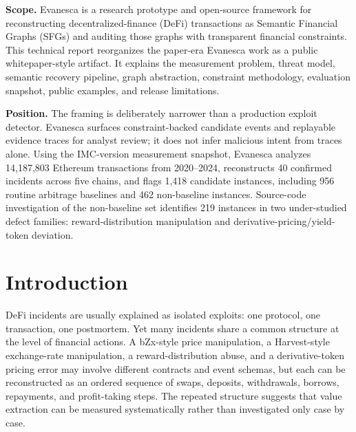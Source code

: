\documentclass[10pt]{article}
\newcommand{\sys}{Evanesca\xspace}
\newcommand{\numtransactions}{14,187,803\xspace}
\newcommand{\numincidents}{40\xspace}
\newcommand{\numflagged}{1,418\xspace}
\newcommand{\numbaseline}{956\xspace}
\newcommand{\numnonbaseline}{462\xspace}
\newcommand{\numdefects}{219\xspace}
\begin{document}
\thispagestyle{firstpage}
\vspace*{0.38in}


\vspace{0.85em}

\vspace{1.65em}

\noindent\textbf{Scope.}
\sys is a research prototype and open-source framework for reconstructing
decentralized-finance (DeFi) transactions as Semantic Financial Graphs (SFGs)
and auditing those graphs with transparent financial constraints. This
technical report reorganizes the paper-era Evanesca work as a public
whitepaper-style artifact. It explains the measurement problem, threat model,
semantic recovery pipeline, graph abstraction, constraint methodology,
evaluation snapshot, public examples, and release limitations.

\vspace{0.4em}
\noindent\textbf{Position.}
The framing is deliberately narrower than a production exploit detector. \sys
surfaces constraint-backed candidate events and replayable evidence traces for
analyst review; it does not infer malicious intent from traces alone. Using the
IMC-version measurement snapshot, \sys analyzes \numtransactions Ethereum
transactions from 2020--2024, reconstructs \numincidents confirmed incidents
across five chains, and flags \numflagged candidate instances, including
\numbaseline routine arbitrage baselines and \numnonbaseline non-baseline
instances. Source-code investigation of the non-baseline set identifies
\numdefects instances in two under-studied defect families:
reward-distribution manipulation and derivative-pricing/yield-token deviation.

\section{Introduction}
\label{sec:introduction}

DeFi incidents are usually explained as isolated exploits: one protocol, one
transaction, one postmortem. Yet many incidents share a common structure at the
level of financial actions. A bZx-style price manipulation, a Harvest-style
exchange-rate manipulation, a reward-distribution abuse, and a derivative-token
pricing error may involve different contracts and event schemas, but each can
be reconstructed as an ordered sequence of swaps, deposits, withdrawals,
borrows, repayments, and profit-taking steps. The repeated structure suggests
that value extraction can be measured systematically rather than investigated
only case by case.
\end{document}
